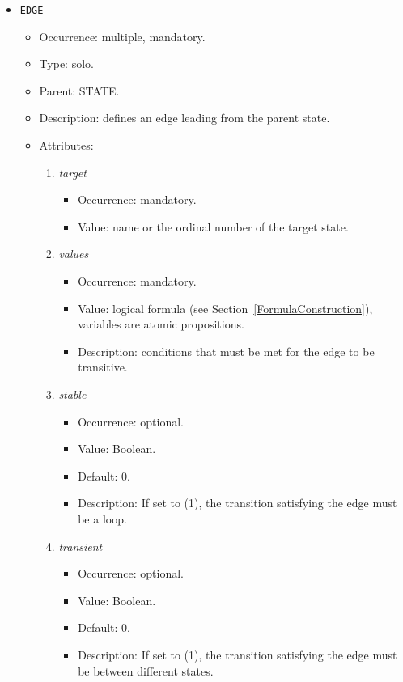 \documentclass[12pt]{article}
\newenvironment{menum}{
\begin{enumerate}
  \setlength{\itemsep}{0pt}
  \setlength{\parskip}{0pt}
  \setlength{\parsep}{0pt}
}{\end{enumerate}}
\newenvironment{mitem}{
\begin{itemize}
  \setlength{\itemsep}{0pt}
  \setlength{\parskip}{0pt}
  \setlength{\parsep}{0pt}
}{\end{itemize}}
\begin{document}
\begin{mitem}
	\item \texttt{EDGE}
	\begin{mitem}
		\item Occurrence: multiple, mandatory.
		\item Type: solo.
		\item Parent: STATE.
		\item Description: defines an edge leading from the parent state.
		\item Attributes: 
		\begin{menum}
			\item \textit{target} 
			\begin{mitem}
				\item Occurrence: mandatory.
				\item Value: name or the ordinal number of the target state.
			\end{mitem}
			\item \textit{values} 
			\begin{mitem}
				\item Occurrence: mandatory.
				\item Value: logical formula (see Section~\ref{FormulaConstruction}), variables are atomic propositions.
				\item Description: conditions that must be met for the edge to be transitive.
			\end{mitem}
			\item \textit{stable} 
			\begin{mitem}
				\item Occurrence: optional.
				\item Value: Boolean.
				\item Default: 0.
				\item Description: If set to (1), the transition satisfying the edge must be a loop.
			\end{mitem}
			\item \textit{transient} 
			\begin{mitem}
				\item Occurrence: optional.
				\item Value: Boolean.
				\item Default: 0.
				\item Description: If set to (1), the transition satisfying the edge must be between different states.
			\end{mitem}
		\end{menum}
	\end{mitem}			
\end{mitem}		
\end{document}
